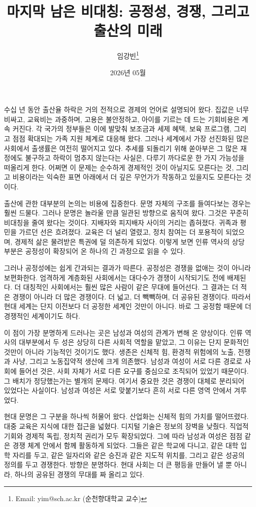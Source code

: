\documentclass[12pt]{article}
\title{마지막 남은 비대칭: 공정성, 경쟁, 그리고 출산의 미래}
\author{임강빈\thanks{Email: yim@sch.ac.kr (순천향대학교 교수)}}
\date{2026년 05월}
\begin{document}
\maketitle

수십 년 동안 출산율 하락은 거의 전적으로 경제의 언어로 설명되어 왔다. 집값은 너무 비싸고, 교육비는 과중하며, 고용은 불안정하고, 아이를 기르는 데 드는 기회비용은 계속 커진다. 각 국가의 정부들은 이에 발맞춰 보조금과 세제 혜택, 보육 프로그램, 그리고 점점 확대되는 가족 지원 체계로 대응해 왔다. 그러나 세계에서 가장 선진화된 많은 사회에서 출생률은 여전히 떨어지고 있다. 추세를 되돌리기 위해 쏟아부은 그 많은 재정에도 불구하고 하락이 멈추지 않는다는 사실은, 다루기 까다로운 한 가지 가능성을 떠올리게 한다. 어쩌면 이 문제는 순수하게 경제적인 것이 아닐지도 모른다는 것, 그리고 비용이라는 익숙한 표면 아래에서 더 깊은 무언가가 작동하고 있을지도 모른다는 것이다.

출산에 관한 대부분의 논의는 비용에 집중한다. 문명 자체의 구조를 들여다보는 경우는 훨씬 드물다. 그러나 문명은 놀라울 만큼 일관된 방향으로 움직여 왔다. 그것은 꾸준히 비대칭을 줄여 왔다는 것이다. 지배자와 피지배자 사이의 거리는 좁혀졌다. 귀족과 평민을 가르던 선은 흐려졌다. 교육은 더 널리 열렸고, 정치 참여는 더 포용적이 되었으며, 경제적 삶은 물려받은 특권에 덜 의존하게 되었다. 이렇게 보면 인류 역사의 상당 부분은 공정성이 확장되어 온 하나의 긴 과정으로 읽을 수 있다.

그러나 공정성에는 쉽게 간과되는 결과가 따른다. 공정성은 경쟁을 없애는 것이 아니라 보편화한다. 엄격하게 계층화된 사회에서는 대다수가 경쟁이 시작되기도 전에 배제된다. 더 대칭적인 사회에서는 훨씬 많은 사람이 같은 무대에 들어선다. 그 결과는 더 적은 경쟁이 아니라 더 많은 경쟁이다. 더 넓고, 더 빽빽하며, 더 공유된 경쟁이다. 따라서 현대 세계는 단지 이전보다 더 공정한 세계인 것만이 아니다. 바로 그 공정함 때문에 더 경쟁적인 세계이기도 하다.

이 점이 가장 분명하게 드러나는 곳은 남성과 여성의 관계가 변해 온 양상이다. 인류 역사의 대부분에서 두 성은 상당히 다른 사회적 역할을 맡았고, 그 이유는 단지 문화적인 것만이 아니라 기능적인 것이기도 했다. 생존은 신체적 힘, 환경적 위험에의 노출, 전쟁과 사냥, 그리고 노동집약적 생산에 크게 의존했다. 남성과 여성이 서로 다른 경로로 사회에 들어선 것은, 사회 자체가 서로 다른 요구를 중심으로 조직되어 있었기 때문이다. 그 배치가 정당했는가는 별개의 문제다. 여기서 중요한 것은 경쟁이 대체로 분리되어 있었다는 사실이다. 남성과 여성은 서로 맞붙기보다 흔히 서로 다른 영역 안에서 겨루었다.

현대 문명은 그 구분을 하나씩 허물어 왔다. 산업화는 신체적 힘의 가치를 떨어뜨렸다. 대중 교육은 지식에 대한 접근을 넓혔다. 디지털 기술은 정보의 장벽을 낮췄다. 직업적 기회와 경제적 독립, 정치적 권리가 모두 확장되었다. 그에 따라 남성과 여성은 점점 같은 경쟁 체계 안에서 함께 활동하게 되었다. 그들은 같은 학교에 다니고, 같은 대학 입학 자리를 두고, 같은 일자리와 같은 승진과 같은 지도적 위치를, 그리고 같은 성공의 정의를 두고 경쟁한다. 방향은 분명하다. 현대 사회는 더 큰 평등을 만들어 낼 뿐 아니라, 하나의 공유된 경쟁의 무대를 짜 올리고 있다.
\end{document}
